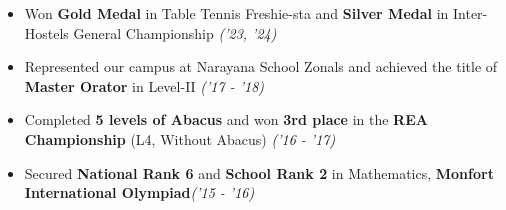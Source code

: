 \documentclass[10pt]{article}
\makeatletter
\newcommand{\thickhline}{%
    \noalign {\ifnum 0=`}\fi \hrule height 0.7pt
    \futurelet \reserved@a \@xhline
}
\makeatother
\begin{document}
\begin{itemize}
    \item Won {\bf Gold Medal} in Table Tennis Freshie-sta and {\bf Silver Medal} in Inter-Hostels General Championship \hfill{\sl \small ('23, '24)}


    
    
    \item Represented our campus at Narayana School Zonals and achieved the title of {\bf Master Orator} in Level-II \hfill {\sl \small ('17 - '18)}
    
    \item Completed {\bf 5 levels of Abacus} and won {\bf 3rd place} in the {\bf REA Championship} (L4, Without Abacus) \hfill{\sl \small ('16 - '17)}
    
    
    \item Secured {\bf National Rank 6} and {\bf School Rank 2} in Mathematics, {\bf Monfort International Olympiad}\hfill{\sl \small ('15 - '16)}
\end{itemize}
\end{document}

